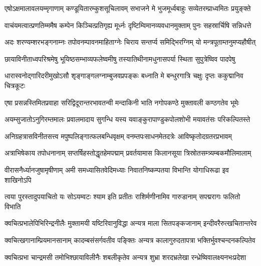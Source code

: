 \fourlineindentedshloka
{एषोऽक्षमालावलयम्मृगाणाम्}
{कण्डूयितारम्कुशसूचिलावम्}
{सभाजने मे भुजमूर्ध्वबाहुः}
{सव्येतरम्प्राध्वमितः प्रयुङ्क्ते} %

\fourlineindentedshloka
{वाचंयमत्वात्प्रणतिम्ममैष}
{कम्पेन किञ्चित्प्रतिगृह्य मूर्ध्नः}
{दृष्टिम्विमानव्यवधानमुक्ताम्}
{पुनः सहस्रार्चिषि सन्निधत्ते} %

\fourlineindentedshloka
{अदः शरण्यम्शरभङ्गनाम्नः}
{तपोवनम्पावनमाहिताग्नेः}
{चिराय सन्तर्प्य समिद्भिरग्निम्}
{यो मन्त्रपूताम्तनुमप्यहौषीत्} %

\fourlineindentedshloka
{छायाविनीताध्वपरिश्रमेषु}
{भूयिष्ठसम्भाव्यफलेष्वमीषु}
{तस्यातिथीनामधुनासपर्या}
{स्थिता सुपुत्रेष्विव पादपेषु} %

\fourlineindentedshloka
{धारास्वनोद्गारिदरीमुखोऽसौ}
{शृङ्गाङ्गलग्नाम्बुजवप्रपङ्कः}
{बध्नाति मे बन्धुरगात्रि चक्षुः}
{दृप्तः ककुद्मानिव चित्रकूटः} %

\fourlineindentedshloka
{एषा प्रसन्नस्तिमितप्रवाहा}
{सरिद्विदूरान्तरभावतन्वी}
{मन्दाकिनी भाति नगोपकण्ठे}
{मुक्तावली कण्ठगतेव भूमेः} %

\fourlineindentedshloka
{अयम्सुजातोऽनुगिरम्तमालः}
{प्रवालमादाय सुगन्धि यस्य}
{यवाङ्कुरापाण्डुकपोलशोभी}
{मयावतंसः परिकल्पितस्ते} %

\fourlineindentedshloka
{अनिग्रहत्रासविनीतसत्त्व}
{मपुष्पलिङ्गात्फलबन्धिवृक्षम्}
{वनम्तपःसाधनमेतदत्रेः}
{आविष्कृतोदग्रतरप्रभावम्} %

\fourlineindentedshloka
{अत्राभिषेकाय तपोधनानाम्}
{सप्तर्षिहस्तोद्धृतहेमपद्माम्}
{प्रवर्तयामास किलानसूया}
{त्रिस्रोतसम्त्र्यम्बकमौलिमालाम्} %

\fourlineindentedshloka
{वीरासनैर्ध्यानजुषामृषीणाम्}
{अमी समध्यासितवेदिमध्याः}
{निवातनिष्कम्पतया विभान्ति}
{योगाधिरूढा इव शाखिनोऽपि} %

\fourlineindentedshloka
{त्वया पुरस्तादुपयाचितो यः}
{सोऽयम्वटः श्याम इति प्रतीतः}
{राशिर्मणीनामिव गारुडानाम्}
{सपद्मरागः फलितो विभाति} %

\fourlineindentedshloka
{क्वचित्प्रभालेपिभिरिन्द्रनीलैः}
{मुक्तामयी यष्टिरिवानुविद्धा}
{अन्यत्र माला सितपङ्कजानाम्}
{इन्दीवरैरुत्खचितान्तरेव} %

\fourlineindentedshloka
{क्वचित्खगानाम्प्रियमानसानाम्}
{कादम्बसंसर्गवतीव पङ्क्तिः}
{अन्यत्र कालागुरुदतापत्रा}
{भक्तिर्भुवश्चन्दनकल्पितेव} %

\fourlineindentedshloka
{क्वचित्प्रभा चान्द्रमसी}
{तमोभिश्छायाविलीनैः शबलीकृतेव}
{अन्यत्र शुभ्रा शरदभ्रलेखा}
{रन्ध्रेष्विवालक्ष्यनभःप्रदेशा} %

